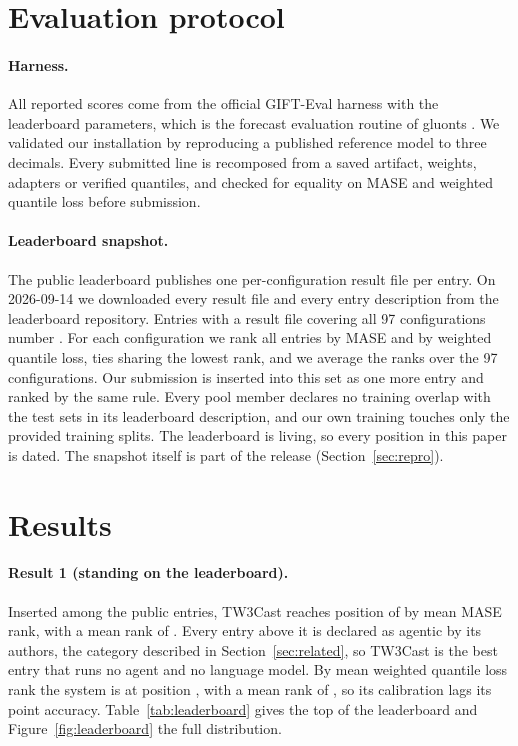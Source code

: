 \documentclass[11pt]{article}
\begin{document}
\section{Evaluation protocol}
\label{sec:evalproto}

\paragraph{Harness.} All reported scores come from the official GIFT-Eval
harness with the leaderboard parameters, which is the forecast evaluation
routine of gluonts \citep{alexandrov2020gluonts}. We
validated our installation by reproducing a published reference model to
three decimals. Every submitted line is recomposed from a saved artifact,
weights, adapters or verified quantiles, and checked for equality on MASE
and weighted quantile loss before submission.

\paragraph{Leaderboard snapshot.} The public leaderboard publishes one
per-configuration result file per entry. On 2026-09-14 we downloaded every
result file and every entry description from the leaderboard repository.
Entries with a result file covering all 97 configurations number
\nPublic. For each configuration we rank all entries by MASE and by
weighted quantile loss, ties sharing the lowest rank, and we average the
ranks over the 97 configurations. Our submission is inserted into this set as one more entry and ranked by
the same rule. Every pool member declares no training overlap with the
test sets in its leaderboard description, and our own training touches
only the provided training splits. The leaderboard is living,
so every position in this paper is dated. The snapshot itself is part of
the release (Section~\ref{sec:repro}).

\section{Results}
\label{sec:results}

\paragraph{Result 1 (standing on the leaderboard).} Inserted among the
\nPublic{} public entries, TW3Cast reaches position \ourPos{} of
\nEntries{} by mean MASE rank, with a mean rank of \ourRank. Every entry above it is declared as agentic by its authors, the category
described in Section~\ref{sec:related}, so TW3Cast is the best entry that
runs no agent and no language model. By mean weighted
quantile loss rank the system is at position \ourWqlPos, with a mean rank
of \ourWqlRank, so its calibration lags its point accuracy.
Table~\ref{tab:leaderboard} gives the top of the leaderboard and
Figure~\ref{fig:leaderboard} the full distribution.
\end{document}
